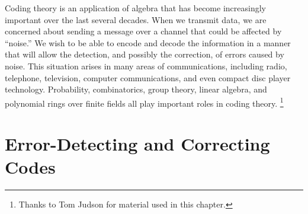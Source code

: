  
Coding theory is an application of algebra that has become
increasingly important over the last several decades. When we transmit
data, we are concerned about sending a message over a channel that
could be affected by ``noise.'' We wish to be able to encode and
decode the information in a manner that will allow the detection, and
possibly the correction, of errors caused by noise. This situation
arises in many areas of communications, including radio, telephone,
television, computer communications, and even compact disc player
technology. Probability, combinatorics, group theory, linear algebra,
and polynomial rings over finite fields all play important roles in
coding theory. \footnote{Thanks to Tom Judson for material used in this chapter.} 
 
 
 
\section{Error-Detecting and Correcting Codes}\label{section:algcodes:1}
  
